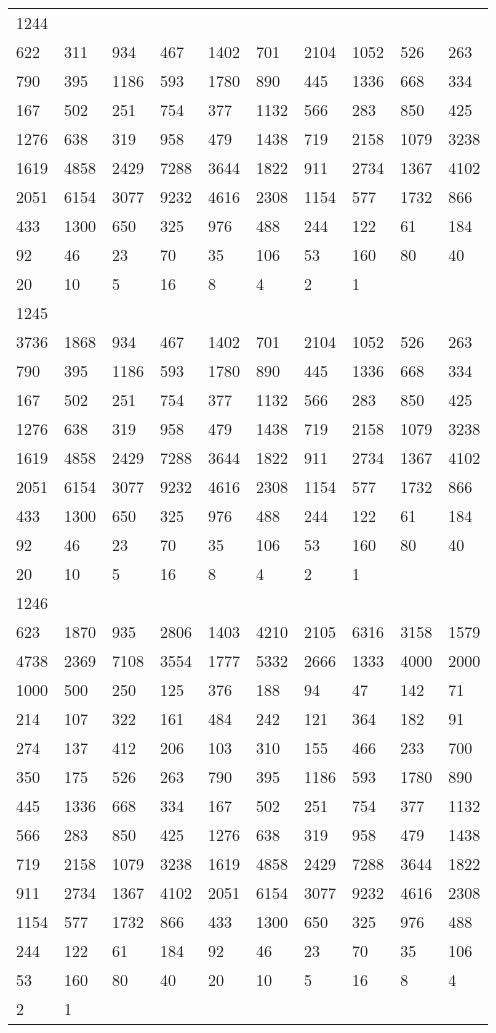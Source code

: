 \begin{longtable}{*{10}{l}}
1244&&&&&&&&&\\
622& 311& 934& 467& 1402& 701& 2104& 1052& 526& 263\\
790& 395& 1186& 593& 1780& 890& 445& 1336& 668& 334\\
167& 502& 251& 754& 377& 1132& 566& 283& 850& 425\\
1276& 638& 319& 958& 479& 1438& 719& 2158& 1079& 3238\\
1619& 4858& 2429& 7288& 3644& 1822& 911& 2734& 1367& 4102\\
2051& 6154& 3077& 9232& 4616& 2308& 1154& 577& 1732& 866\\
433& 1300& 650& 325& 976& 488& 244& 122& 61& 184\\
92& 46& 23& 70& 35& 106& 53& 160& 80& 40\\
20& 10& 5& 16& 8& 4& 2& 1& \\

1245&&&&&&&&&\\
3736& 1868& 934& 467& 1402& 701& 2104& 1052& 526& 263\\
790& 395& 1186& 593& 1780& 890& 445& 1336& 668& 334\\
167& 502& 251& 754& 377& 1132& 566& 283& 850& 425\\
1276& 638& 319& 958& 479& 1438& 719& 2158& 1079& 3238\\
1619& 4858& 2429& 7288& 3644& 1822& 911& 2734& 1367& 4102\\
2051& 6154& 3077& 9232& 4616& 2308& 1154& 577& 1732& 866\\
433& 1300& 650& 325& 976& 488& 244& 122& 61& 184\\
92& 46& 23& 70& 35& 106& 53& 160& 80& 40\\
20& 10& 5& 16& 8& 4& 2& 1& \\

1246&&&&&&&&&\\
623& 1870& 935& 2806& 1403& 4210& 2105& 6316& 3158& 1579\\
4738& 2369& 7108& 3554& 1777& 5332& 2666& 1333& 4000& 2000\\
1000& 500& 250& 125& 376& 188& 94& 47& 142& 71\\
214& 107& 322& 161& 484& 242& 121& 364& 182& 91\\
274& 137& 412& 206& 103& 310& 155& 466& 233& 700\\
350& 175& 526& 263& 790& 395& 1186& 593& 1780& 890\\
445& 1336& 668& 334& 167& 502& 251& 754& 377& 1132\\
566& 283& 850& 425& 1276& 638& 319& 958& 479& 1438\\
719& 2158& 1079& 3238& 1619& 4858& 2429& 7288& 3644& 1822\\
911& 2734& 1367& 4102& 2051& 6154& 3077& 9232& 4616& 2308\\
1154& 577& 1732& 866& 433& 1300& 650& 325& 976& 488\\
244& 122& 61& 184& 92& 46& 23& 70& 35& 106\\
53& 160& 80& 40& 20& 10& 5& 16& 8& 4\\
2& 1& \\


\end{longtable}
